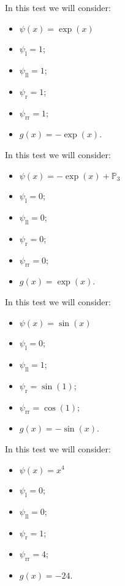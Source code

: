 \documentclass[12pt,a4paper]{article}
\newcommand{\psil}{\psi_\text{l}}
\newcommand{\psill}{\psi_{\text{ll}}}
\newcommand{\psir}{\psi_\text{r}}
\newcommand{\psirr}{\psi_{\text{rr}}}
\begin{document}
In this test we will consider:
\begin{itemize}
\item $\psi(x)=\exp(x)$
\item $\psil=1$;
\item $\psill=1$;
\item $\psir=1$;
\item $\psirr=1$;
\item $g(x)=-\exp(x)$.
\end{itemize}

%
\pagebreak
In this test we will consider:
\begin{itemize}
\item $\psi(x)=-\exp(x)+\mathbb{P}_3$
\item $\psil=0$;
\item $\psill=0$;
\item $\psir=0$;
\item $\psirr=0$;
\item $g(x)=\exp(x)$.
\end{itemize}

\pagebreak
In this test we will consider:
\begin{itemize}
\item $\psi(x)=\sin(x)$
\item $\psil=0$;
\item $\psill=1$;
\item $\psir=\sin(1)$;
\item $\psirr=\cos(1)$;
\item $g(x)=-\sin(x)$.
\end{itemize}

\pagebreak
In this test we will consider:
\begin{itemize}
\item $\psi(x)=x^4$
\item $\psil=0$;
\item $\psill=0$;
\item $\psir=1$;
\item $\psirr=4$;
\item $g(x)=-24$.
\end{itemize}

%
\end{document}
